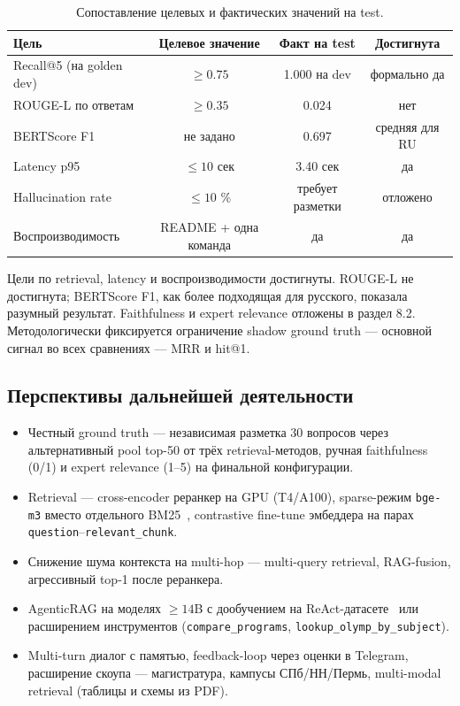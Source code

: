 \documentclass[a4paper,12pt]{extarticle}
\begin{document}
\begin{table}[ht]
\caption{Сопоставление целевых и фактических значений на test.}
\label{tab:goals}
\centering
\begin{tabular}{lccc}
\toprule
Цель & Целевое значение & Факт на test & Достигнута \\
\midrule
Recall@5 (на golden dev) & $\geq 0.75$ & 1.000 на dev & формально да \\
ROUGE-L по ответам & $\geq 0.35$ & 0.024 & нет \\
BERTScore F1 & не задано & 0.697 & средняя для RU \\
Latency p95 & $\leq 10$ сек & 3.40 сек & да \\
Hallucination rate & $\leq 10$ \% & требует разметки & отложено \\
Воспроизводимость & README + одна команда & да & да \\
\bottomrule
\end{tabular}
\end{table}

Цели по retrieval, latency и воспроизводимости достигнуты. ROUGE-L не достигнута; BERTScore F1, как более подходящая для русского, показала разумный результат. Faithfulness и expert relevance отложены в раздел 8.2. Методологически фиксируется ограничение shadow ground truth --- основной сигнал во всех сравнениях --- MRR и hit@1.

\subsection{Перспективы дальнейшей деятельности}
\begin{itemize}
    \item Честный ground truth --- независимая разметка 30 вопросов через альтернативный pool top-50 от трёх retrieval-методов, ручная faithfulness (0/1) и expert relevance (1--5) на финальной конфигурации.
    \item Retrieval --- cross-encoder реранкер на GPU (T4/A100), sparse-режим \texttt{bge-m3} вместо отдельного BM25~\cite{bm25}, contrastive fine-tune эмбеддера на парах \texttt{question}--\texttt{relevant\_chunk}.
    \item Снижение шума контекста на multi-hop --- multi-query retrieval, RAG-fusion, агрессивный top-1 после реранкера.
    \item AgenticRAG на моделях $\geq 14$B с дообучением на ReAct-датасете~\cite{react} или расширением инструментов (\texttt{compare\_programs}, \texttt{lookup\_olymp\_by\_subject}).
    \item Multi-turn диалог с памятью, feedback-loop через оценки в Telegram, расширение скоупа --- магистратура, кампусы СПб/НН/Пермь, multi-modal retrieval (таблицы и схемы из PDF).
\end{itemize}
\end{document}

